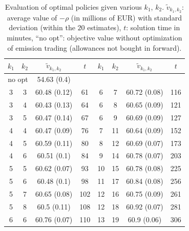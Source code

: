 \documentclass{article}              %
\begin{document}
\begin{table}
\begin{center}
\begin{tabular}{cccc|cccc}
$k_1$ & $k_2$ & $\tilde v_{k_1,k_2}$ & $t$ & $k_1$ & $k_2$ & $\tilde v_{k_1,k_2}$ & $t$ \\
\hline
	\multicolumn{2}{c}{no opt}		&	54.63	(0.4)	&		\\
\hline
3	&	3	&	60.48	(0.12)	&	61	&	6	&	7	&	60.72	(0.08)	&	116	\\
3	&	4	&	60.43	(0.13)	&	64	&	6	&	8	&	60.65	(0.09)	&	121	\\
3	&	5	&	60.47	(0.14)	&	67	&	6	&	9	&	60.69	(0.09)	&	127	\\
4	&	4	&	60.47	(0.09)	&	76	&	7	&	11	&	60.64	(0.09)	&	152	\\
4	&	5	&	60.59	(0.11)	&	80	&	8	&	12	&	60.69	(0.07)	&	173	\\
4	&	6	&	60.51	(0.1)	&	84	&	9	&	14	&	60.78	(0.07)	&	203	\\
5	&	5	&	60.62	(0.07)	&	93	&	10	&	15	&	60.78	(0.08)	&	225	\\
5	&	6	&	60.48	(0.1)	&	98	&	11	&	17	&	60.84	(0.08)	&	256	\\
5	&	7	&	60.65	(0.08)	&	102	&	12	&	16	&	60.75	(0.09)	&	261	\\
5	&	8	&	60.5	(0.11)	&	108	&	12	&	18	&	60.92	(0.07)	&	281	\\
6	&	6	&	60.76	(0.07)	&	110	&	13	&	19	&	60.9	(0.06)	&	306	\\

\hline
\end{tabular}\label{tab:res}\caption{Evaluation of optimal policies given various $k_1$, $k_2$. $\tilde v_{k_{1},k_{2}}$: average value of $-\rho$ (in
millions of EUR) with standard deviation (within the $20$ estimates),
$t$: solution time in minutes, ``no opt'': objective value without
optimization of emission trading (allowances not bought in forward).}
\end{center}
\end{table}
\end{document}
